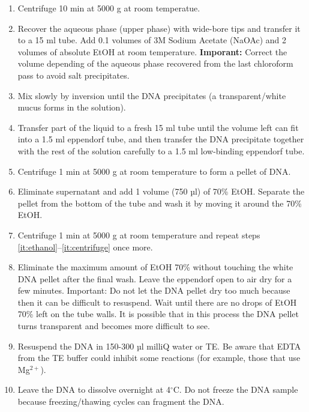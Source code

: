 \documentclass{article}
\begin{document}
\begin{enumerate}
   \item Centrifuge 10 min at 5000 g at room temperatue.
   \item  Recover the aqueous phase (upper phase) with wide-bore tips and transfer it to a 15 ml tube. Add 0.1 volumes of 3M Sodium Acetate (NaOAc) and 2 volumes of absolute EtOH at room temperature. \textbf{Imporant:} Correct the volume depending of the aqueous phase recovered from the last chloroform pass to avoid salt precipitates.
   \item Mix slowly by inversion until the DNA precipitates (a transparent/white mucus forms in the solution).
   \item Transfer part of the liquid to a fresh 15 ml tube until the volume left can fit into a 1.5 ml eppendorf tube, and then transfer the DNA precipitate together with the rest of the solution carefully to a 1.5 ml low-binding eppendorf tube.
   \item Centrifuge 1 min at 5000 g at room temperature to form a pellet of DNA.
   \item Eliminate supernatant and add 1 volume (750 µl) of 70\% EtOH. Separate the pellet from the bottom of the tube and wash it by moving it around the 70\% EtOH.\label{it:ethanol}
   \item Centrifuge 1 min at 5000 g at room temperature and repeat steps \ref{it:ethanol}--\ref{it:centrifuge} once more. \label{it:centrifuge}
   \item Eliminate the maximum amount of EtOH 70\% without touching the white DNA pellet after the final wash. Leave the eppendorf open to air dry for a few minutes. Important: Do not let the DNA pellet dry too much because then it can be difficult to resuspend. Wait until there are no drops of EtOH 70\% left on the tube walls. It is possible that in this process the DNA pellet turns transparent and becomes more difficult to see.
   \item Resuspend the DNA in 150-300 µl milliQ water or TE. Be aware that EDTA from the TE buffer could inhibit some reactions (for example, those that use Mg$^{2+}$).
   \item Leave the DNA to dissolve overnight at 4$^\circ{}$C. Do not freeze the DNA sample because freezing/thawing cycles can fragment the DNA.
\end{enumerate}
\end{document}

